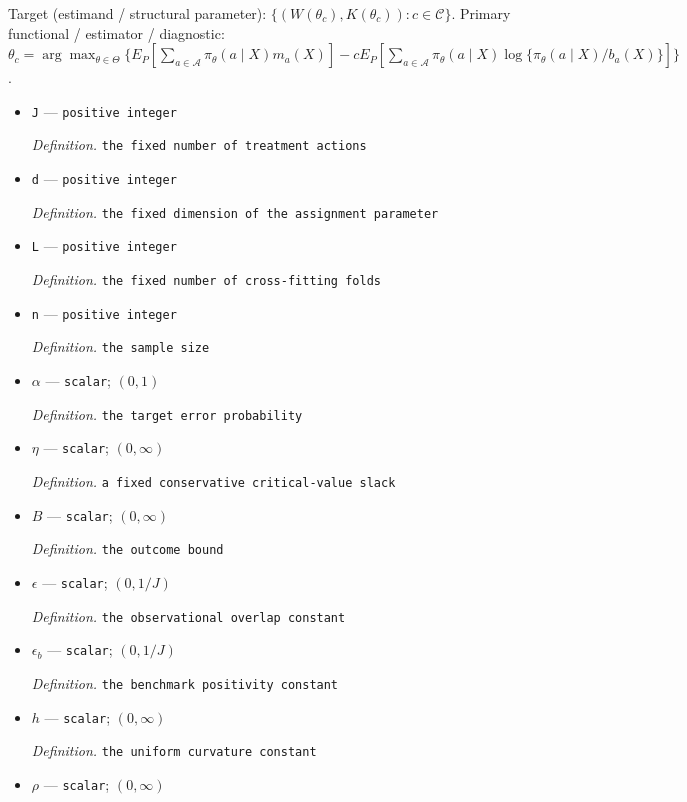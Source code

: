 \documentclass{article}
\begin{document}
Target (estimand / structural parameter): \(\{(W(\theta_c),K(\theta_c)):c\in\mathcal C\}\).
Primary functional / estimator / diagnostic: \(\theta_c=\arg\max_{\theta\in\Theta}\{E_P[\sum_{a\in\mathcal A}\pi_\theta(a\mid X)m_a(X)]-cE_P[\sum_{a\in\mathcal A}\pi_\theta(a\mid X)\log\{\pi_\theta(a\mid X)/b_a(X)\}]\}\).
\begin{itemize}
  \item \texttt{J} --- \texttt{positive integer}
  \par\smallskip\noindent\emph{Definition.} \texttt{the fixed number of treatment actions}
  \item \texttt{d} --- \texttt{positive integer}
  \par\smallskip\noindent\emph{Definition.} \texttt{the fixed dimension of the assignment parameter}
  \item \texttt{L} --- \texttt{positive integer}
  \par\smallskip\noindent\emph{Definition.} \texttt{the fixed number of cross-\allowbreak{}fitting folds}
  \item \texttt{n} --- \texttt{positive integer}
  \par\smallskip\noindent\emph{Definition.} \texttt{the sample size}
  \item \(\alpha\) --- \texttt{scalar}; \((0,1)\)
  \par\smallskip\noindent\emph{Definition.} \texttt{the target error probability}
  \item \(\eta\) --- \texttt{scalar}; \((0,\infty)\)
  \par\smallskip\noindent\emph{Definition.} \texttt{a fixed conservative critical-\allowbreak{}value slack}
  \item \(B\) --- \texttt{scalar}; \((0,\infty)\)
  \par\smallskip\noindent\emph{Definition.} \texttt{the outcome bound}
  \item \(\epsilon\) --- \texttt{scalar}; \((0,1/J)\)
  \par\smallskip\noindent\emph{Definition.} \texttt{the observational overlap constant}
  \item \(\epsilon_b\) --- \texttt{scalar}; \((0,1/J)\)
  \par\smallskip\noindent\emph{Definition.} \texttt{the benchmark positivity constant}
  \item \(h\) --- \texttt{scalar}; \((0,\infty)\)
  \par\smallskip\noindent\emph{Definition.} \texttt{the uniform curvature constant}
  \item \(\rho\) --- \texttt{scalar}; \((0,\infty)\)

\end{itemize}
\end{document}
